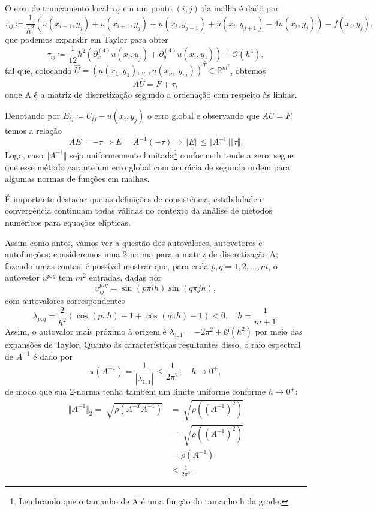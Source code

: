\documentclass[../differential_methods.tex]{subfiles}
\begin{document}
O erro de truncamento local \(\tau_{ij}\) em um ponto \((i, j)\) da malha é dado por
\[
	\tau_{ij}\coloneqq \frac{1}{h^{2}}(u(x_{i-1}, y_{j})+u(x_{i+1}, y_{j})+u(x_{i}, y_{j-1})+u(x_{i}, y_{j+1})-4u(x_{i}, y_{j}))-f(x_{i}, y_{j}),
\]
que podemos expandir em Taylor para obter
\[
	\tau_{ij}\coloneqq \frac{1}{12}h^{2}(\partial_{x}^{(4)}u(x_{i}, y_{j})+\partial_{y}^{(4)}u(x_{i}, y_{j}))+\mathcal{O}(h^{4}),
\]
tal que, colocando \(\hat{U}=(u(x_1,y_1), \dotsc , u(x_{m}, y_{m}))^{T}\in \mathbb{R}^{m^{2}}\), obtemos
\[
	A \hat{U}=F+\tau ,
\]
onde A é a matriz de discretização segundo a ordenação com respeito às linhas.

Denotando por \(E_{ij}\coloneqq U_{ij}-u(x_{i}, y_{j})\) o erro global e observando que \(AU=F\), temos a relação
\[
	AE=-\tau \Rightarrow E=A^{-1}(-\tau )\Rightarrow \Vert E \Vert\leq \Vert A^{-1} \Vert\Vert \tau  \Vert.
\]
Logo, caso \(\Vert A^{-1} \Vert\) seja uniformemente limitada\footnote{Lembrando que o tamanho de A é uma função do tamanho h da grade.} conforme h tende a zero, segue que esse método garante um erro global com acurácia de segunda ordem para algumas normas de funções em malhas.

É importante destacar que as definições de consistência, estabilidade e convergência continuam todas válidas no contexto da análise de métodos numéricos para equações elípticas.

Assim como antes, vamos ver a questão dos autovalores, autovetores e autofunções: consideremos uma 2-norma para a matriz de discretização A; fazendo umas contas, é possível mostrar que, para cada \(p, q=1,2,\dotsc ,m\), o autovetor \(u^{p, q}\) tem \(m^{2}\) entradas, dadas por
\[
	u_{ij}^{p, q}=\sin^{}{(p\pi ih)}\sin^{}{(q\pi jh)},
\]
com autovalores correspondentes
\[
	\lambda_{p,q}=\frac{2}{h^{2}}(\cos^{}{(p\pi h)}-1+\cos^{}{(q\pi h)}-1)<0, \quad h=\frac{1}{m+1}.
\]
Assim, o autovalor mais próximo à origem é \(\lambda_{1,1}=-2\pi^{2}+\mathcal{O}(h^{2})\) por meio das expansões de Taylor. Quanto às características resultantes disso, o raio espectral de \(A^{-1}\) é dado por
\[
	\pi (A^{-1})=\frac{1}{| \lambda_{1,1} |}\leq \frac{1}{2\pi^{2}},\quad h\to 0^{+},
\]
de modo que sua 2-norma tenha também um limite uniforme conforme \(h\to 0^{+}\):
\begin{align*}
	\Vert A^{-1} \Vert_{2}=\sqrt[]{\rho (A^{-T}A^{-1})} & = \sqrt[]{\rho((A^{-1})^{2})}  \\
	                                                    & = \sqrt[]{\rho ((A^{-1})^{2})} \\
	                                                    & = \rho (A^{-1})                \\
	                                                    & \leq \frac{1}{2\pi^{2}}.
\end{align*}
\end{document}
